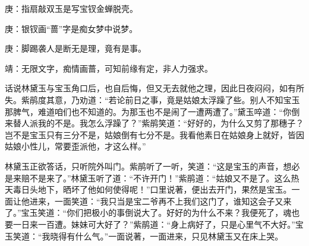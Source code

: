 

\begin{parag}
    \begin{note}庚：指扇敲双玉是写宝钗金蝉脱壳。\end{note}
\end{parag}


\begin{parag}
    \begin{note}庚：银钗画“蔷”字是痴女梦中说梦。\end{note}
\end{parag}


\begin{parag}
    \begin{note}庚：脚踢袭人是断无是理，竟有是事。\end{note}
\end{parag}


\begin{parag}
    \begin{note}靖：无限文字，痴情画蔷，可知前缘有定，非人力强求。\end{note}
\end{parag}


\begin{parag}
    话说林黛玉与宝玉角口后，也自后悔，但又无去就他之理，因此日夜闷闷，如有所失。紫鹃度其意，乃劝道：“若论前日之事，竟是姑娘太浮躁了些。别人不知宝玉那脾气，难道咱们也不知道的。为那玉也不是闹了一遭两遭了。”黛玉啐道：“你倒来替人派我的不是。我怎么浮躁了？”紫鹃笑道：“好好的，为什么又剪了那穗子？岂不是宝玉只有三分不是，姑娘倒有七分不是。我看他素日在姑娘身上就好，皆因姑娘小性儿，常要歪派他，才这么样。”
\end{parag}


\begin{parag}
    林黛玉正欲答话，只听院外叫门。紫鹃听了一听，笑道：“这是宝玉的声音，想必是来赔不是来了。”林黛玉听了道：“不许开门！”紫鹃道：“姑娘又不是了。这么热天毒日头地下，晒坏了他如何使得呢！”口里说著，便出去开门，果然是宝玉。一面让他进来，一面笑道：“我只当是宝二爷再不上我们这门了，谁知这会子又来了。”宝玉笑道：“你们把极小的事倒说大了。好好的为什么不来？我便死了，魂也要一日来一百遭。妹妹可大好了？”紫鹃道：“身上病好了，只是心里气不大好。”宝玉笑道：“我晓得有什么气。”一面说著，一面进来，只见林黛玉又在床上哭。
\end{parag}


